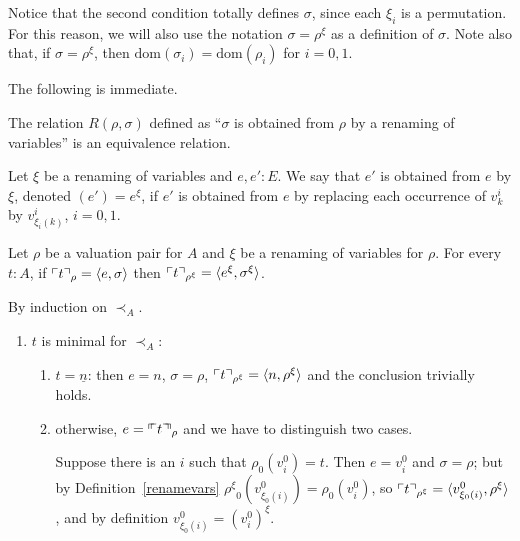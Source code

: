 \documentclass[numreferences]{kluwer}
\newcommand{\less}{\mathrel{\prec_A}}
\newcommand{\mlfnv}[2]{\ensuremath\ulcorner\!\!\ulcorner{#1}\urcorner\!\!\urcorner_{#2}}
\newcommand{\mlfn}[2]{\ensuremath\ulcorner{#1}\urcorner_{#2}}
\newcommand{\domain}{\ensuremath{\mathrm{dom}}}
\newcommand{\renamevar}[2]{\ensuremath{{#1}^{#2}}}
\newcommand{\isrenamevar}[3]{\ensuremath{{#1}=\renamevar{#2}{#3}}}
\begin{document}
\begin{article}
Notice that the second condition totally defines $\sigma$, since
each $\xi_i$ is a permutation.  For this reason, we will also use the
notation {\isrenamevar\sigma\rho\xi} as a definition of $\sigma$.
Note also that, if {\isrenamevar\sigma\rho\xi},
then $\domain(\sigma_i)=\domain(\rho_i)$ for $i=0,1$.

The following is immediate.
\begin{proposition}\label{renamevarsequiv}
The relation $R(\rho,\sigma)$ defined as ``$\sigma$ is obtained from $\rho$
by a renaming of variables'' is an equivalence relation.
\end{proposition}

\begin{definition}
Let $\xi$ be a renaming of variables and $e,e':E$.  We say that $e'$
is obtained from $e$ by $\xi$, denoted {\isrenamevar{(e')}e\xi}, if $e'$
is obtained from $e$ by replacing each occurrence of $v^i_k$ by
$v^i_{\xi_i(k)}$, $i=0,1$.
\end{definition}

\begin{lemma}\label{renamequote}
Let $\rho$ be a valuation pair for $A$ and $\xi$ be a renaming of
variables for $\rho$.  For every $t:A$, if $\mlfn{t}{\rho}=\langle
e,\sigma\rangle$ then $\mlfn{t}{\renamevar\rho\xi}=%
\langle\renamevar{e}\xi,\renamevar\sigma\xi\rangle$.
\end{lemma}
\begin{pf} By induction on $\less$.
\begin{enumerate}
\item $t$ is minimal for $\less$:
\begin{enumerate}
\item $t=\underline n$: then $e=n$, $\sigma=\rho$,
$\mlfn{t}{{\renamevar\rho\xi}}=\langle n,{\renamevar\rho\xi}\rangle$ and the 
conclusion trivially holds.
\item otherwise, $e=\mlfnv{t}{\rho}$ and we have to distinguish two
cases.

Suppose there is an $i$ such that $\rho_0(v^0_i)=t$.  Then $e=v^0_i$ and
$\sigma=\rho$; but by Definition~\ref{renamevars}
$\renamevar\rho\xi_0\left(v^0_{\xi_0(i)}\right)=\rho_0(v^0_i)$, so
$\mlfn{t}{\renamevar\rho\xi}=\langle v^0_{\xi_0(i)},\renamevar\rho\xi\rangle$,
and by definition {\isrenamevar{v^0_{\xi_0(i)}}{(v^0_i)}\xi}.


\end{enumerate}
\end{enumerate}
\end{pf}
\end{article}
\end{document}
